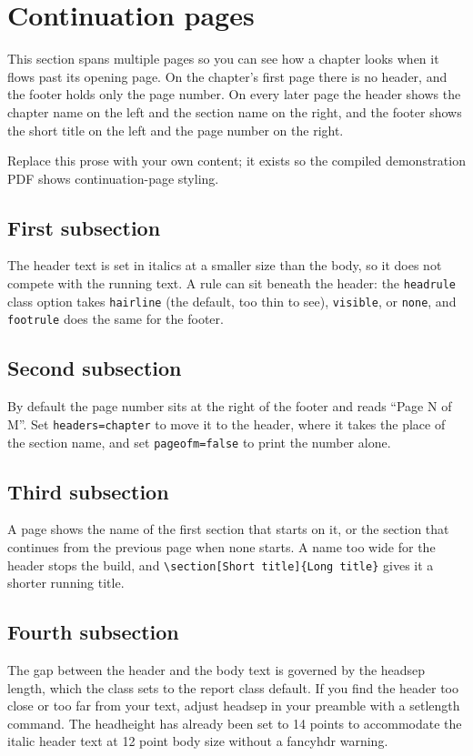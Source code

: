 \section{Continuation pages}
This section spans multiple pages so you can see how a chapter looks when it flows past its opening page. On the chapter's first page there is no header, and the footer holds only the page number. On every later page the header shows the chapter name on the left and the section name on the right, and the footer shows the short title on the left and the page number on the right.

Replace this prose with your own content; it exists so the compiled demonstration PDF shows continuation-page styling.

\subsection{First subsection}
The header text is set in italics at a smaller size than the body, so it does not compete with the running text. A rule can sit beneath the header: the \texttt{headrule} class option takes \texttt{hairline} (the default, too thin to see), \texttt{visible}, or \texttt{none}, and \texttt{footrule} does the same for the footer.

\subsection{Second subsection}
By default the page number sits at the right of the footer and reads ``Page N of M''. Set \texttt{headers=chapter} to move it to the header, where it takes the place of the section name, and set \texttt{pageofm=false} to print the number alone.

\subsection{Third subsection}
A page shows the name of the first section that starts on it, or the section that continues from the previous page when none starts. A name too wide for the header stops the build, and \texttt{\textbackslash section[Short title]\{Long title\}} gives it a shorter running title.

\subsection{Fourth subsection}
The gap between the header and the body text is governed by the headsep length, which the class sets to the report class default. If you find the header too close or too far from your text, adjust headsep in your preamble with a setlength command. The headheight has already been set to 14 points to accommodate the italic header text at 12 point body size without a fancyhdr warning.

